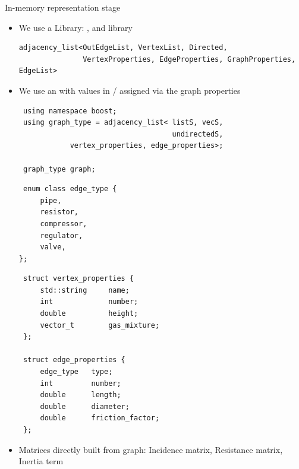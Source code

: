 \begin{frame}[fragile]{In-memory representation stage}
\begin{itemize}
\setlength{\itemindent}{-1.0em}
    \item We use a  Library:  ,   and  library {
\begin{verbatim}
adjacency_list<OutEdgeList, VertexList, Directed, 
               VertexProperties, EdgeProperties, GraphProperties, EdgeList>
\end{verbatim}      
    }
\item We use an  with values in / assigned via the graph properties


\begin{center}

\begin{minipage}{0.51\textwidth}
\vspace{-0.25cm}
\begin{verbatim}
 using namespace boost;
 using graph_type = adjacency_list< listS, vecS,  
                                    undirectedS,
            vertex_properties, edge_properties>;
           
 graph_type graph;
\end{verbatim}  
\vspace{-0.75cm}
\begin{verbatim}
 enum class edge_type {
     pipe,
     resistor,
     compressor,
     regulator,
     valve,
};
 \end{verbatim}
\vfill
\end{minipage}%
\hfill
\begin{minipage}{0.38\textwidth}
    \begin{verbatim}
 struct vertex_properties {
     std::string     name;
     int             number;
     double          height;
     vector_t        gas_mixture;   
 };

 struct edge_properties {
     edge_type   type;
     int         number;
     double      length;
     double      diameter;
     double      friction_factor;
 };  
\end{verbatim}    
\end{minipage}%
\end{center}

\item Matrices directly built from graph: Incidence matrix, Resistance matrix, Inertia term
\end{itemize}
\end{frame}

